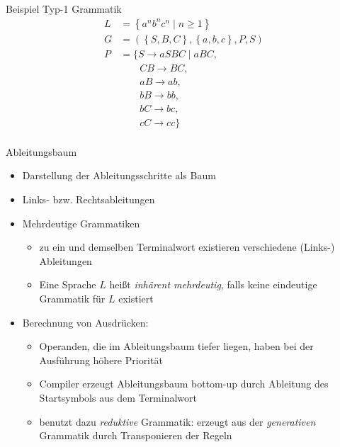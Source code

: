 \begin{frame}{Beispiel Typ-1 Grammatik}
	\begin{align*}
		L&=\left\{a^nb^nc^n \mid n \geq 1\right\}\\
		G&=\left(\left\{S,B,C\right\},\left\{a,b,c\right\},P,S\right)\\
		P&=\{S \rightarrow aSBC \mid aBC,\\
		         &\qquad CB \rightarrow BC,\\
		         &\qquad aB \rightarrow ab,\\
		         &\qquad bB \rightarrow bb,\\
		         &\qquad bC \rightarrow bc,\\
		         &\qquad cC \rightarrow cc\}\\
	\end{align*}
\end{frame}

\begin{frame}{Ableitungsbaum}
	\begin{itemize}
		\item Darstellung der Ableitungsschritte als Baum
		\item Links- bzw. Rechtsableitungen
		\item Mehrdeutige Grammatiken
		\begin{itemize}
			\item zu ein und demselben Terminalwort existieren verschiedene (Links-) Ableitungen
			\item Eine Sprache $L$ heißt \emph{inhärent mehrdeutig}, falls keine eindeutige Grammatik für $L$ existiert
		\end{itemize}
		\item Berechnung von Ausdrücken:
		\begin{itemize}
			\item Operanden, die im Ableitungsbaum tiefer liegen, haben bei der Ausführung höhere Priorität
			\item Compiler erzeugt Ableitungsbaum bottom-up durch Ableitung des Startsymbols aus dem Terminalwort
			\item benutzt dazu \emph{reduktive} Grammatik: erzeugt aus der \emph{generativen} Grammatik durch Transponieren der Regeln
		\end{itemize}
	\end{itemize}
\end{frame}